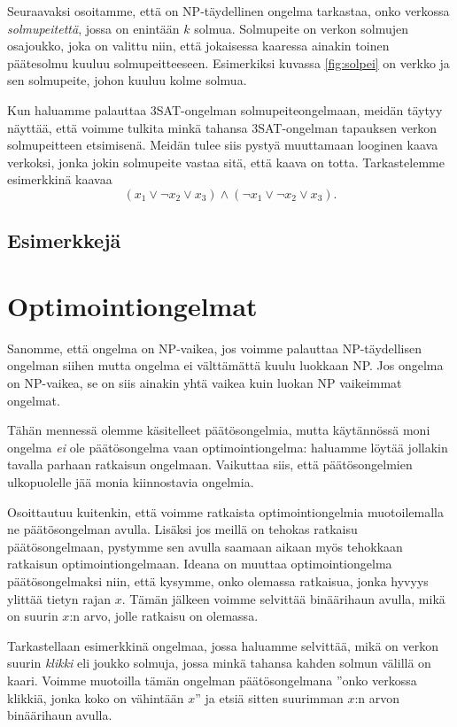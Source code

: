 Seuraavaksi osoitamme, että on NP-täydellinen ongelma tarkastaa,
onko verkossa \emph{solmupeitettä}, jossa on enintään $k$ solmua.
Solmupeite on verkon solmujen osajoukko, joka on valittu niin,
että jokaisessa kaaressa ainakin toinen päätesolmu kuuluu
solmupeitteeseen.
Esimerkiksi kuvassa \ref{fig:solpei} on verkko ja sen solmupeite,
johon kuuluu kolme solmua.

Kun haluamme palauttaa 3SAT-ongelman solmupeiteongelmaan,
meidän täytyy näyttää, että voimme tulkita minkä tahansa
3SAT-ongelman tapauksen verkon solmupeitteen etsimisenä.
Meidän tulee siis pystyä muuttamaan looginen kaava verkoksi,
jonka jokin solmupeite vastaa sitä, että kaava on totta.
Tarkastelemme esimerkkinä kaavaa
\[(x_1 \lor \neg x_2 \lor x_3) \land (\neg x_1 \lor \neg x_2 \lor x_3).\]




\subsection{Esimerkkejä}

\section{Optimointiongelmat}

Sanomme, että ongelma on NP-vaikea, jos voimme palauttaa
NP-täydellisen ongelman siihen mutta ongelma ei välttämättä
kuulu luokkaan NP.
Jos ongelma on NP-vaikea, se on siis ainakin yhtä vaikea
kuin luokan NP vaikeimmat ongelmat.

Tähän mennessä olemme käsitelleet päätösongelmia,
mutta käytännössä moni ongelma \emph{ei} ole päätösongelma
vaan optimointiongelma: haluamme löytää jollakin
tavalla parhaan ratkaisun ongelmaan.
Vaikuttaa siis, että päätöson\-gelmien ulkopuolelle jää
monia kiinnostavia ongelmia.

Osoittautuu kuitenkin, että voimme ratkaista optimointiongelmia
muotoilemalla ne päätösongelman avulla.
Lisäksi jos meillä on tehokas ratkaisu päätösongelmaan,
pystymme sen avulla saamaan aikaan myös tehokkaan
ratkaisun optimointiongelmaan.
Ideana on muuttaa optimointiongelma päätös\-ongelmaksi niin,
että kysymme, onko olemassa ratkaisua, jonka hyvyys ylittää
tietyn rajan $x$. Tämän jälkeen voimme selvittää binäärihaun
avulla, mikä on suurin $x$:n arvo, jolle ratkaisu on olemassa.

Tarkastellaan esimerkkinä ongelmaa, jossa haluamme selvittää,
mikä on verkon suurin \emph{klikki} eli joukko solmuja,
jossa minkä tahansa kahden solmun välillä on kaari.
Voimme muotoilla tämän ongelman päätösongelmana
''onko verkossa klikkiä, jonka koko on vähintään $x$''
ja etsiä sitten suurimman $x$:n arvon binäärihaun avulla.